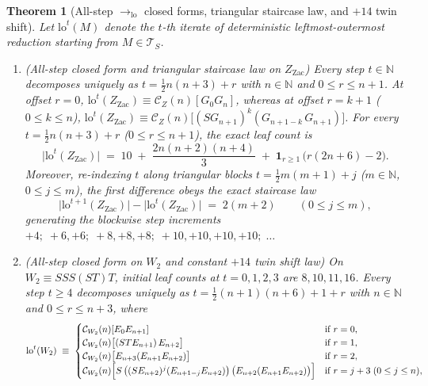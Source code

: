 \documentclass[11pt,reqno]{amsart}
\numberwithin{equation}{section}
\theoremstyle{plain}
\newtheorem{theorem}{Theorem}[section]
\theoremstyle{definition}
\theoremstyle{remark}
\newcommand{\TS}{\mathcal{T}_S}
\begin{document}
\begin{theorem}[All-step $\to_{\mathrm{lo}}$ closed forms, triangular staircase law, and $+14$ twin shift]
\label{thm:all-step-jump-ahead}
Let $\mathrm{lo}^t(M)$ denote the $t$-th iterate of deterministic leftmost-outermost reduction starting from $M \in \TS$.
\begin{enumerate}[label=(\roman*),leftmargin=2.2em]
\item \emph{(All-step closed form and triangular staircase law on $Z_{\mathrm{Zac}}$)} Every step $t \in \mathbb{N}$ decomposes uniquely as $t = \frac{1}{2}n(n+3) + r$ with $n \in \mathbb{N}$ and $0 \le r \le n + 1$. At offset $r = 0$, $\mathrm{lo}^t(Z_{\mathrm{Zac}}) \equiv \mathcal{C}_Z(n)[G_0 G_n]$, whereas at offset $r = k + 1$ ($0 \le k \le n$), $\mathrm{lo}^t(Z_{\mathrm{Zac}}) \equiv \mathcal{C}_Z(n)\bigl[(S G_{n+1})^k(G_{n+1-k}\,G_{n+1})\bigr]$. For every $t = \frac{1}{2}n(n+3) + r$ ($0 \le r \le n + 1$), the exact leaf count is
\begin{equation}
\label{eq:zachos-cubic-leaves}
\bigl|\mathrm{lo}^t(Z_{\mathrm{Zac}})\bigr|
\;=\; 10 \;+\; \frac{2n(n+2)(n+4)}{3} \;+\; \mathbf{1}_{r \ge 1}\,\bigl(r(2n+6) - 2\bigr).
\end{equation}
Moreover, re-indexing $t$ along triangular blocks $t = \frac{1}{2}m(m+1) + j$ ($m \in \mathbb{N}$, $0 \le j \le m$), the first difference obeys the exact staircase law
\begin{equation}
\label{eq:zachos-staircase}
\bigl|\mathrm{lo}^{t+1}(Z_{\mathrm{Zac}})\bigr| - \bigl|\mathrm{lo}^t(Z_{\mathrm{Zac}})\bigr|
\;=\; 2(m + 2)
\qquad (0 \le j \le m),
\end{equation}
generating the blockwise step increments $+4;\; +6, +6;\; +8, +8, +8;\; +10, +10, +10, +10;\; \dots$
\item \emph{(All-step closed form on $W_2$ and constant $+14$ twin shift law)} On $W_2 \equiv S S S (S T) T$, initial leaf counts at $t = 0, 1, 2, 3$ are $8, 10, 11, 16$. Every step $t \ge 4$ decomposes uniquely as $t = \frac{1}{2}(n+1)(n+6) + 1 + r$ with $n \in \mathbb{N}$ and $0 \le r \le n + 3$, where
\[
\mathrm{lo}^t(W_2) \;\equiv\;
\begin{cases}
\mathcal{C}_{W_2}(n)[E_0 E_{n+1}] & \textrm{if } r = 0, \\
\mathcal{C}_{W_2}(n)\bigl[(S T E_{n+1})\,E_{n+2}\bigr] & \textrm{if } r = 1, \\
\mathcal{C}_{W_2}(n)\bigl[E_{n+3}(E_{n+1} E_{n+2})\bigr] & \textrm{if } r = 2, \\
\mathcal{C}_{W_2}(n)\Bigl[S\,\bigl((S E_{n+2})^j(E_{n+1-j} E_{n+2})\bigr)\,\bigl(E_{n+2}(E_{n+1} E_{n+2})\bigr)\Bigr] & \textrm{if } r = j + 3 \; (0 \le j \le n),

\end{cases}\]
\end{enumerate}
\end{theorem}
\end{document}
